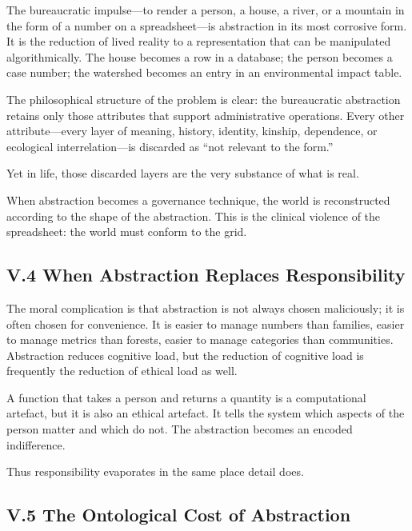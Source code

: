 \documentclass[12pt,letterpaper]{article}
\begin{document}
The bureaucratic impulse—to render a person, a house, a river, or a mountain in the form of a number on a spreadsheet—is abstraction in its most corrosive form. It is the reduction of lived reality to a representation that can be manipulated algorithmically. The house becomes a row in a database; the person becomes a case number; the watershed becomes an entry in an environmental impact table.

The philosophical structure of the problem is clear: the bureaucratic abstraction retains only those attributes that support administrative operations. Every other attribute—every layer of meaning, history, identity, kinship, dependence, or ecological interrelation—is discarded as ``not relevant to the form.''

Yet in life, those discarded layers are the very substance of what is real.

When abstraction becomes a governance technique, the world is reconstructed according to the shape of the abstraction. This is the clinical violence of the spreadsheet: the world must conform to the grid.

\subsection{V.4 When Abstraction Replaces Responsibility}

The moral complication is that abstraction is not always chosen maliciously; it is often chosen for convenience. It is easier to manage numbers than families, easier to manage metrics than forests, easier to manage categories than communities. Abstraction reduces cognitive load, but the reduction of cognitive load is frequently the reduction of ethical load as well.

A function that takes a person and returns a quantity is a computational artefact, but it is also an ethical artefact. It tells the system which aspects of the person matter and which do not. The abstraction becomes an encoded indifference.

Thus responsibility evaporates in the same place detail does.

\subsection{V.5 The Ontological Cost of Abstraction}
\end{document}
